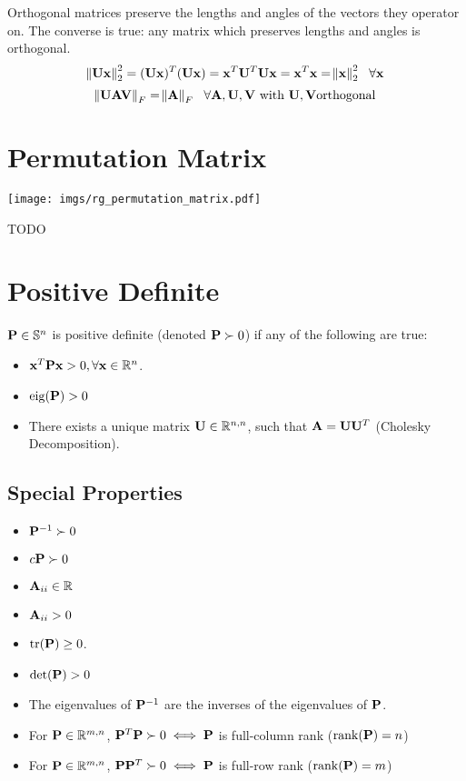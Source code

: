Orthogonal matrices preserve the lengths and angles of the vectors they operator on. The converse is true: any matrix which preserves lengths and angles is orthogonal.
\begin{equation}
\norm{\mathbf{U} \mathbf{x}}^2_2=(\mathbf{U}\mathbf{x})^T(\mathbf{U}\mathbf{x})=\mathbf{x}^T\mathbf{U}^T\mathbf{U}\mathbf{x}=\mathbf{x}^T\mathbf{x}=\norm{\mathbf{x}}^2_2~~\forall \mathbf{x}
\end{equation}
\begin{equation}
\norm{\mathbf{U} \mathbf{A} \mathbf{V}}_F=\norm{\mathbf{A}}_F~~\forall \mathbf{A},\mathbf{U},\mathbf{V}~\textrm{with}~\mathbf{U},\mathbf{V} \textrm{orthogonal}
\end{equation}



\section{Permutation Matrix}
\begin{center}
\texttt{[image: imgs/rg\_permutation\_matrix.pdf]}
\end{center}

TODO



\section{Positive Definite}

$\mathbf{P}\in\mathbb{S}^{n}$ is positive definite (denoted $\mathbf{P}\succ0$) if any of the following are true:
\begin{itemize}
\item $\mathbf{x}^T\mathbf{P}\mathbf{x}>0,\forall\mathbf{x}\in\mathbb{R}^{n}$.
\item $\operatorname{eig}(\mathbf{P})>0$
\item There exists a unique matrix $\mathbf{U}\in\mathbb{R}^{n,n}$, such that $\mathbf{A}=\mathbf{U}\mathbf{U}^T$ (Cholesky Decomposition). %
\end{itemize}


\subsection*{Special Properties}

\begin{itemize}
\item $\mathbf{P}^{-1}\succ0$
\item $c\mathbf{P}\succ0$
\item $\mathbf{A}_{ii}\in\mathbb{R}$
\item $\mathbf{A}_{ii}>0$
\item $\operatorname{tr}(\mathbf{P})\ge0$. %
\item $\det(\mathbf{P})>0$
\item The eigenvalues of $\mathbf{P}^{-1}$ are the inverses of the eigenvalues of $\mathbf{P}$.
\item For $\mathbf{P}\in\mathbb{R}^{m,n}$, $\mathbf{P}^T\mathbf{P}\succ0\iff \mathbf{P}$ is full-column rank ($\operatorname{rank}(\mathbf{P})=n$)
\item For $\mathbf{P}\in\mathbb{R}^{m,n}$, $\mathbf{P}\mathbf{P}^T\succ0\iff \mathbf{P}$ is full-row rank ($\operatorname{rank}(\mathbf{P})=m$)
\end{itemize}

